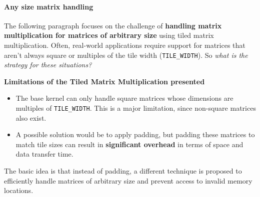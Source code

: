 \paragraph{Any size matrix handling}

The following paragraph focuses on the challenge of \textbf{handling matrix multiplication for matrices of arbitrary size} using tiled matrix multiplication. Often, real-world applications require support for matrices that aren't always square or multiples of the tile width (\texttt{TILE\_WIDTH}). So \emph{what is the strategy for these situations?}

\highspace
\begin{flushleft}
    \textcolor{Red2}{ \textbf{Limitations of the Tiled Matrix Multiplication presented}}
\end{flushleft}
\begin{itemize}
    \item The base kernel can only handle square matrices whose dimensions are multiples of \texttt{TILE\_WIDTH}. This is a major limitation, since non-square matrices also exist.

    \item A possible solution would be to apply padding, but padding these matrices to match tile sizes can result in \textbf{significant overhead} in terms of space and data transfer time.
\end{itemize}
The basic idea is that instead of padding, a different technique is proposed to efficiently handle matrices of arbitrary size and prevent access to invalid memory locations.

